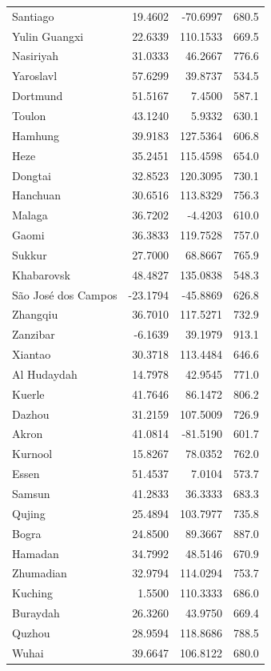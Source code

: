 \begin{longtable}{lrrc}
Santiago & 19.4602 & -70.6997 & 680.5 \\
Yulin  Guangxi & 22.6339 & 110.1533 & 669.5 \\
Nasiriyah & 31.0333 & 46.2667 & 776.6 \\
Yaroslavl & 57.6299 & 39.8737 & 534.5 \\
Dortmund & 51.5167 & 7.4500 & 587.1 \\
Toulon & 43.1240 & 5.9332 & 630.1 \\
Hamhung & 39.9183 & 127.5364 & 606.8 \\
Heze & 35.2451 & 115.4598 & 654.0 \\
Dongtai & 32.8523 & 120.3095 & 730.1 \\
Hanchuan & 30.6516 & 113.8329 & 756.3 \\
Malaga & 36.7202 & -4.4203 & 610.0 \\
Gaomi & 36.3833 & 119.7528 & 757.0 \\
Sukkur & 27.7000 & 68.8667 & 765.9 \\
Khabarovsk & 48.4827 & 135.0838 & 548.3 \\
São José dos Campos & -23.1794 & -45.8869 & 626.8 \\
Zhangqiu & 36.7010 & 117.5271 & 732.9 \\
Zanzibar & -6.1639 & 39.1979 & 913.1 \\
Xiantao & 30.3718 & 113.4484 & 646.6 \\
Al Hudaydah & 14.7978 & 42.9545 & 771.0 \\
Kuerle & 41.7646 & 86.1472 & 806.2 \\
Dazhou & 31.2159 & 107.5009 & 726.9 \\
Akron & 41.0814 & -81.5190 & 601.7 \\
Kurnool & 15.8267 & 78.0352 & 762.0 \\
Essen & 51.4537 & 7.0104 & 573.7 \\
Samsun & 41.2833 & 36.3333 & 683.3 \\
Qujing & 25.4894 & 103.7977 & 735.8 \\
Bogra & 24.8500 & 89.3667 & 887.0 \\
Hamadan & 34.7992 & 48.5146 & 670.9 \\
Zhumadian & 32.9794 & 114.0294 & 753.7 \\
Kuching & 1.5500 & 110.3333 & 686.0 \\
Buraydah & 26.3260 & 43.9750 & 669.4 \\
Quzhou & 28.9594 & 118.8686 & 788.5 \\
Wuhai & 39.6647 & 106.8122 & 680.0 \\

\end{longtable}
